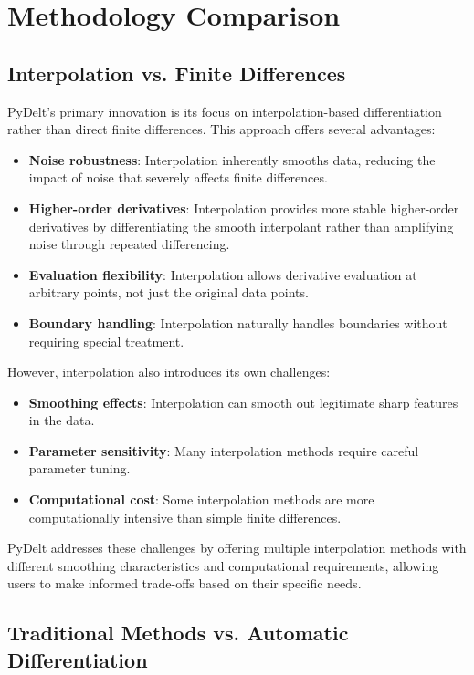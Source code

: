 \documentclass[11pt,a4paper]{article}
\begin{document}
\section{Methodology Comparison}

\subsection{Interpolation vs. Finite Differences}

PyDelt's primary innovation is its focus on interpolation-based differentiation rather than direct finite differences. This approach offers several advantages:

\begin{itemize}
    \item \textbf{Noise robustness}: Interpolation inherently smooths data, reducing the impact of noise that severely affects finite differences.
    \item \textbf{Higher-order derivatives}: Interpolation provides more stable higher-order derivatives by differentiating the smooth interpolant rather than amplifying noise through repeated differencing.
    \item \textbf{Evaluation flexibility}: Interpolation allows derivative evaluation at arbitrary points, not just the original data points.
    \item \textbf{Boundary handling}: Interpolation naturally handles boundaries without requiring special treatment.
\end{itemize}

However, interpolation also introduces its own challenges:

\begin{itemize}
    \item \textbf{Smoothing effects}: Interpolation can smooth out legitimate sharp features in the data.
    \item \textbf{Parameter sensitivity}: Many interpolation methods require careful parameter tuning.
    \item \textbf{Computational cost}: Some interpolation methods are more computationally intensive than simple finite differences.
\end{itemize}

PyDelt addresses these challenges by offering multiple interpolation methods with different smoothing characteristics and computational requirements, allowing users to make informed trade-offs based on their specific needs.

\subsection{Traditional Methods vs. Automatic Differentiation}
\end{document}
